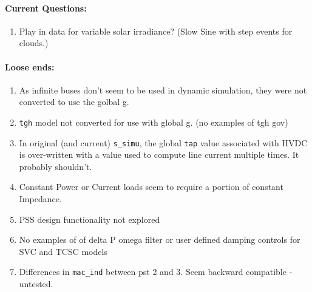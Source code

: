 \documentclass[12pt]{article}
\begin{document}
\begin{multicols}{2}
\begin{enumerate}
	\end{enumerate}



\paragraph{Current Questions:}
	\begin{enumerate}
	\itemsep0em 
	
	
	\item Play in data for variable solar irradiance? (Slow Sine with step events for clouds.)
	
	\end{enumerate}	

\paragraph{Loose ends:} %
	\begin{enumerate}
	\item As infinite buses don't seem to be used in dynamic simulation, they were not converted to use the golbal g.
		\item \verb|tgh| model not converted for use with global g. (no examples of tgh gov)
		\item In original (and current) \verb|s_simu|, the global \verb|tap| value associated with HVDC is over-written with  a value used to compute line current multiple times. It probably shouldn't.
		\item Constant Power or Current loads seem to require a portion of constant Impedance.
		\item PSS design functionality not explored
		\item No examples of of delta P omega filter or user defined damping controls for SVC and TCSC models
		\item Differences in \verb|mac_ind| between pst 2 and 3. Seem backward compatible - untested.
	\end{enumerate}
\vfill\null

\end{multicols}
\end{document}
